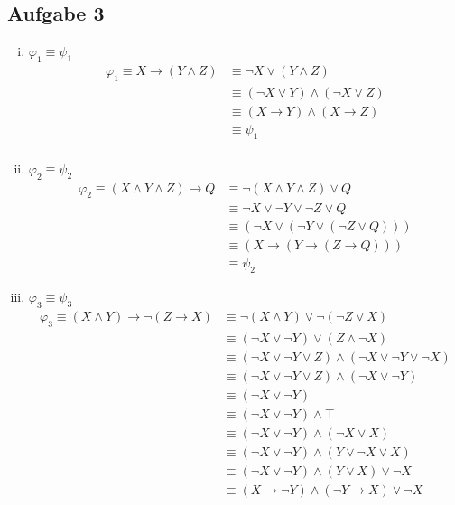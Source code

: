 \documentclass[a4paper,10pt]{article}
\begin{document}
	\subsection*{Aufgabe 3}
\begin{enumerate}[(i)]
\item $\varphi_1 \equiv \psi_1$
	\begin{align*}
	\varphi_1 \equiv X \rightarrow (Y \wedge Z) 
	&\equiv \neg X \vee (Y \wedge Z) \\
	&\equiv (\neg X \vee Y) \wedge (\neg X \vee Z) \\
	&\equiv (X \rightarrow Y) \wedge (X \rightarrow Z) \\
	&\equiv \psi_1 \\
	\end{align*}
\item $\varphi_2 \equiv \psi_2$
	\begin{align*}
	\varphi_2 \equiv (X \wedge Y \wedge Z) \rightarrow Q 
	&\equiv \neg (X \wedge Y \wedge Z) \vee Q \\
	&\equiv \neg X \vee \neg Y \vee \neg Z \vee Q \\
	&\equiv (\neg X \vee (\neg Y \vee (\neg Z \vee Q))) \\
	&\equiv (X \rightarrow (Y \rightarrow (Z \rightarrow Q))) \\
	&\equiv \psi_2 
	\end{align*}	 
\item $\varphi_3 \equiv \psi_3$
	\begin{align*}
	\varphi_3 \equiv (X \wedge Y) \rightarrow \neg (Z \rightarrow X) 
	&\equiv \neg (X \wedge Y) \vee \neg (\neg Z \vee X)  \\
	&\equiv (\neg X \vee \neg Y) \vee (Z \wedge \neg X)  \\
	&\equiv (\neg X \vee \neg Y \vee Z) \wedge (\neg X \vee \neg Y \vee \neg X)  \\
	&\equiv (\neg X \vee \neg Y \vee Z) \wedge (\neg X \vee \neg Y)  \\
	&\equiv (\neg X \vee \neg Y) \\
	&\equiv (\neg X \vee \neg Y) \wedge \top \\
	&\equiv (\neg X \vee \neg Y) \wedge (\neg X \vee X) \\
	&\equiv (\neg X \vee \neg Y) \wedge (Y \vee \neg X \vee X) \\
	&\equiv (\neg X \vee \neg Y) \wedge (Y \vee X) \vee \neg X \\
	&\equiv (X \rightarrow \neg Y) \wedge (\neg Y \rightarrow X) \vee \neg X \\

\end{align*}
\end{enumerate}
\end{document}

